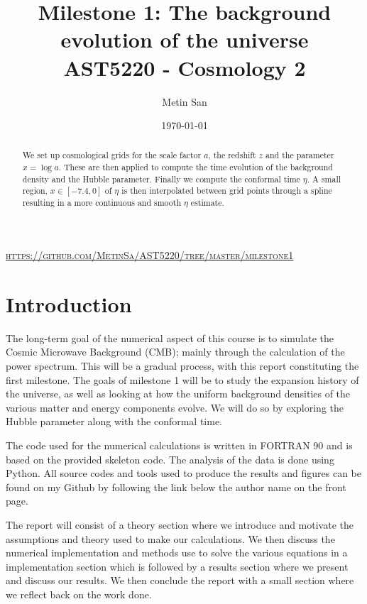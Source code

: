 \documentclass[a4paper, 10pt, reqno]{amsart}
\title[Milestone 1]{\Large{Milestone 1: The background evolution of the universe} \\
\normalsize{AST5220 - Cosmology 2}}
\author[San]{Metin San}
\date{\today}
\begin{document}
\maketitle
\begin{center}
   \vspace*{-0.6cm} \textsc{\url{https://github.com/MetinSa/AST5220/tree/master/milestone1}}
\end{center}

\begin{abstract}
    We set up cosmological grids for the scale factor $a$, the
    redshift $z$ and the parameter $x = \log a$. These are then applied
    to compute the time evolution of the background density and the
    Hubble parameter. Finally we compute the conformal time $\eta$. A small region, $x \in [-7.4,0]$ of $\eta$ is then interpolated between grid points through a spline resulting in a more continuous and smooth $\eta$ estimate.
\end{abstract}

\section{Introduction}
The long-term goal of the numerical aspect of this course is to
simulate the Cosmic Microwave Background (CMB); mainly through the
calculation of the power spectrum. This will be a gradual process, with
this report constituting the first milestone. The goals of milestone 1
will be to study the expansion history of the universe, as well as
looking at how the uniform background densities of the various matter
and energy components evolve. We will do so by exploring the Hubble
parameter along with the conformal time.

The code used for the numerical calculations is written in FORTRAN 90
and is based on the provided skeleton code. The analysis of the data is
done using Python. All source codes and tools used to produce the
results and figures can be found on my Github by following the link
below the author name on the front page.

The report will consist of a theory section where we introduce and
motivate the assumptions and theory used to make our calculations. We
then discuss the numerical implementation and methods use to solve the
various equations in a implementation section which is followed by a
results section where we present and discuss our results.
We then conclude the report with a small section where we reflect back
on the work done.
\end{document}
